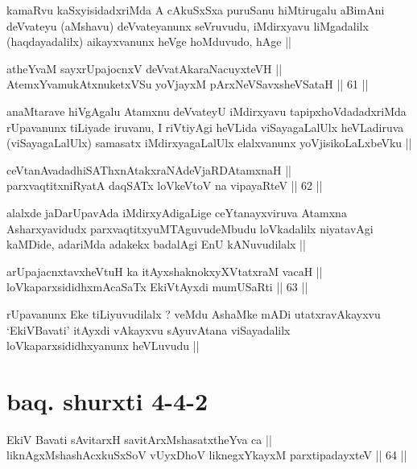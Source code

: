 \begin{artha}
kamaRvu kaSxyisidadxriMda A cAkuSxSxa puruSanu hiMtirugalu aBimAni
deVvateyu (aMshavu) deVvateyanunx seVruvudu, iMdirxyavu liMgadalilx
(haqdayadalilx) aikayxvanunx heVge hoMduvudo, hAge ||  
\end{artha}

\begin{shl}
atheYvaM sayxrUpajocnxV deVvatAkaraNacuyxteVH ||  \\
AtemxYvamukAtxnuketxVSu yoVjayxM pArxNeVSavxsheVSataH ||  61 ||  
\end{shl}

\begin{artha}
anaMtarave hiVgAgalu Atamxnu deVvateyU iMdirxyavu tapipxhoVdadadxriMda
rUpavanunx tiLiyade iruvanu, I riVtiyAgi heVLida viSayagaLalUlx
heVLadiruva (viSayagaLalUlx) samasatx iMdirxyagaLalUlx elalxvanunx
yoVjisikoLaLxbeVku ||
\end{artha}

\begin{shl}
ceVtanAvadadhiSAThxnAtakxraNAdeVjaRDAtamxnaH || \\
parxvaqtitxniRyatA daqSATx loVkeV\s toV na vipayaRteV ||  62 ||  
\end{shl}

\begin{artha}
alalxde jaDarUpavAda iMdirxyAdigaLige ceYtanayxviruva Atamxna
Asharxyavidudx parxvaqtitxyuMTAguvudeMbudu loVkadalilx niyatavAgi
kaMDide, adariMda adakekx badalAgi EnU kANuvudilalx ||
\end{artha}

\begin{shl}
arUpajacnxtavxheVtuH ka itAyxshaknokxyXVtatxraM vacaH || \\
loVkaparxsididhxmAcaSaTx EkiVtAyxdi mumUSaRti ||  63 ||  
\end{shl}

\begin{artha}
rUpavanunx Eke tiLiyuvudilalx ? veMdu AshaMke mADi utatxravAkayxvu
`EkiVBavati' itAyxdi vAkayxvu sAyuvAtana viSayadalilx
loVkaparxsididhxyanunx heVLuvudu ||
\end{artha}

\section*{baq. shurxti 4-4-2}

\begin{shl}
EkiV Bavati sAvitarxH savitArxM\s shasatxtheYva ca || \\
liknAgxMshashAcxkuSxSoV vUyxDhoV liknegxYkayxM parxtipadayxteV ||  64 ||  
\end{shl}

